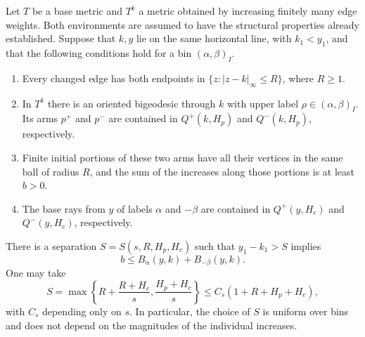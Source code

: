 \begin{lemma}\label{lem:budget-comparison}
Let $T$ be a base metric and $T^k$ a metric obtained by increasing finitely
many edge weights.  Both environments are assumed to have the structural
properties already established.  Suppose that $k,y$ lie on the same
horizontal line, with $k_1<y_1$, and that the following conditions hold for
a bin $(\alpha,\beta)_I$.
\begin{enumerate}[label=\textup{(\roman*)}]
\item Every changed edge has both endpoints in
$\{z:|z-k|_\infty\le R\}$, where $R\ge1$.
\item In $T^k$ there is an oriented bigeodesic through $k$ with upper
label $\rho\in(\alpha,\beta)_I$.  Its arms $p^+$ and $p^-$ are contained
in $Q^+(k,H_p)$ and $Q^-(k,H_p)$, respectively.
\item Finite initial portions of these two arms have all their vertices
in the same ball of radius $R$, and the sum of the increases along those
portions is at least $b>0$.
\item The base rays from $y$ of labels $\alpha$ and $-\beta$ are contained
in $Q^+(y,H_c)$ and $Q^-(y,H_c)$, respectively.
\end{enumerate}
There is a separation $S=S(s,R,H_p,H_c)$ such that $y_1-k_1>S$ implies
\begin{equation}\label{eq:budget-comparison}
 b\le B_\alpha(y,k)+B_{-\beta}(y,k).
\end{equation}
One may take
\begin{equation}\label{eq:budget-separation}
 S=\max\left\{R+\frac{R+H_c}{s},\frac{H_p+H_c}{s}\right\}
 \le C_s(1+R+H_p+H_c),
\end{equation}
with $C_s$ depending only on $s$.  In particular, the choice
of $S$ is uniform over bins and does not depend on the magnitudes of the
individual increases.
\end{lemma}

